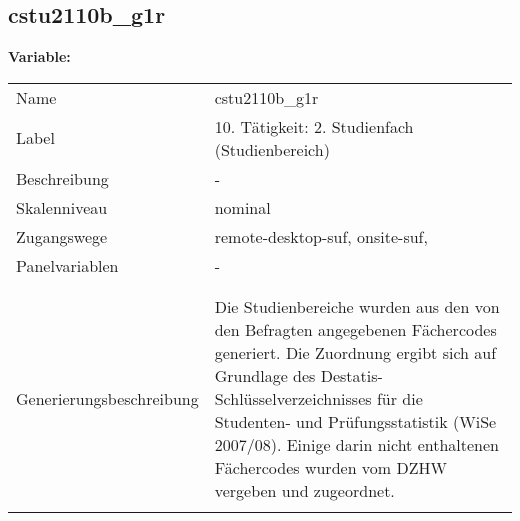 	
	
	\subsection{cstu2110b\_g1r}
	\label{subSection:cstu2110b_g1r}

	\noindent\textbf{Variable:}\\
		\begin{tabular}{lL{11.3cm}}
			\label{tableVariable:cstu2110b_g1r}
			Name & cstu2110b\_g1r \\
			Label & 10. Tätigkeit: 2. Studienfach (Studienbereich) \\
			Beschreibung & - \\
			Skalenniveau & nominal \\
			Zugangswege &
				remote-desktop-suf,
				onsite-suf,
 \\
			Panelvariablen & -
			 \\
			 \\
 \\
					Generierungsbeschreibung & Die Studienbereiche wurden aus den von den Befragten angegebenen Fächercodes generiert. Die Zuordnung ergibt sich auf Grundlage des Destatis-Schlüsselverzeichnisses für die Studenten- und Prüfungsstatistik (WiSe 2007/08). Einige darin nicht enthaltenen Fächercodes wurden vom DZHW vergeben und zugeordnet. 
				 \\	
			 \\
		\end{tabular}






